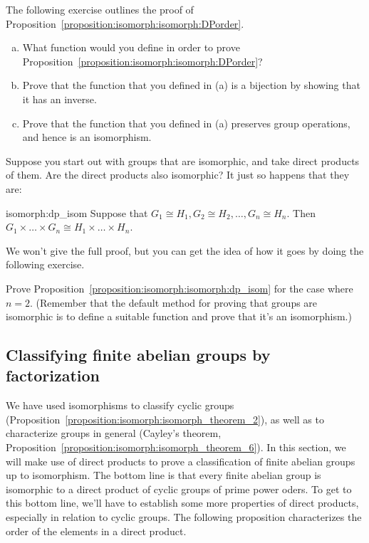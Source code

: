 The following exercise outlines the proof of Proposition~\ref{proposition:isomorph:isomorph:DPorder}.

\begin{exercise}{}
\begin{enumerate}[(a)]
\item
What function would you define in order to prove Proposition~\ref{proposition:isomorph:isomorph:DPorder}?
\item
Prove that the function that you defined in (a) is a bijection by showing that it has an inverse.
\item
Prove that the function that you defined in (a) preserves group operations, and hence is an isomorphism.
\end{enumerate}
\end{exercise}

Suppose you start out with groups that are isomorphic, and take direct products of them.  Are the direct products also isomorphic? It just so happens that they are:

\begin{prop}{isomorph:dp_isom}
Suppose that $G_1 \cong H_1, G_2 \cong H_2, \ldots, G_n \cong H_n$. Then $G_1 \times \ldots \times G_n  \cong H_1 \times \ldots \times H_n$.
\end{prop}

\noindent
We won't give the full proof, but you can get the idea of how it goes by doing the following exercise.

\begin{exercise}{}
Prove Proposition~\ref{proposition:isomorph:isomorph:dp_isom} for the case where $n=2$. (Remember that the default method for proving that groups are isomorphic is to define a suitable function and prove that it's an isomorphism.)
\end{exercise}

\subsection{Classifying finite abelian groups by factorization}

We have used isomorphisms to classify cyclic groups (Proposition~\ref{proposition:isomorph:isomorph_theorem_2}), as well as to characterize  groups in general (Cayley's theorem, Proposition~\ref{proposition:isomorph:isomorph_theorem_6}). In this section, we will make use of direct products to prove a classification of finite abelian groups up to isomorphism. The bottom line is that every finite abelian group is isomorphic to a direct product of cyclic groups of prime power oders. To get to this bottom line, we'll have to establish some more properties of direct products, especially in relation to cyclic groups.  The following  proposition characterizes the order of the elements in a direct product.

